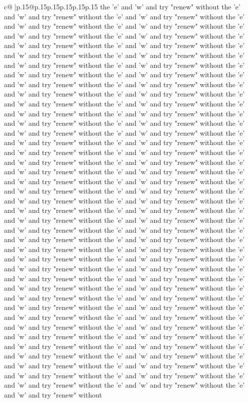 \documentclass{article}
\begin{document}
{\begin{supertabular}{c@{$\;$}|p{.15\linewidth}@{}p{.15\linewidth}p{.15\linewidth}p{.15\linewidth}p{.15\linewidth}p{.15\linewidth}}
{{{the 'e' and 'w' and try "renew" without the 'e' and 'w' and try "renew" without the 'e' and 'w' and try "renew" without the 'e' and 'w' and try "renew" without the 'e' and 'w' and try "renew" without the 'e' and 'w' and try "renew" without the 'e' and 'w' and try "renew" without the 'e' and 'w' and try "renew" without the 'e' and 'w' and try "renew" without the 'e' and 'w' and try "renew" without the 'e' and 'w' and try "renew" without the 'e' and 'w' and try "renew" without the 'e' and 'w' and try "renew" without the 'e' and 'w' and try "renew" without the 'e' and 'w' and try "renew" without the 'e' and 'w' and try "renew" without the 'e' and 'w' and try "renew" without the 'e' and 'w' and try "renew" without the 'e' and 'w' and try "renew" without the 'e' and 'w' and try "renew" without the 'e' and 'w' and try "renew" without the 'e' and 'w' and try "renew" without the 'e' and 'w' and try "renew" without the 'e' and 'w' and try "renew" without the 'e' and 'w' and try "renew" without the 'e' and 'w' and try "renew" without the 'e' and 'w' and try "renew" without the 'e' and 'w' and try "renew" without the 'e' and 'w' and try "renew" without the 'e' and 'w' and try "renew" without the 'e' and 'w' and try "renew" without the 'e' and 'w' and try "renew" without the 'e' and 'w' and try "renew" without the 'e' and 'w' and try "renew" without the 'e' and 'w' and try "renew" without the 'e' and 'w' and try "renew" without the 'e' and 'w' and try "renew" without the 'e' and 'w' and try "renew" without the 'e' and 'w' and try "renew" without the 'e' and 'w' and try "renew" without the 'e' and 'w' and try "renew" without the 'e' and 'w' and try "renew" without the 'e' and 'w' and try "renew" without the 'e' and 'w' and try "renew" without the 'e' and 'w' and try "renew" without the 'e' and 'w' and try "renew" without the 'e' and 'w' and try "renew" without the 'e' and 'w' and try "renew" without the 'e' and 'w' and try "renew" without the 'e' and 'w' and try "renew" without the 'e' and 'w' and try "renew" without the 'e' and 'w' and try "renew" without the 'e' and 'w' and try "renew" without the 'e' and 'w' and try "renew" without the 'e' and 'w' and try "renew" without the 'e' and 'w' and try "renew" without the 'e' and 'w' and try "renew" without the 'e' and 'w' and try "renew" without the 'e' and 'w' and try "renew" without the 'e' and 'w' and try "renew" without the 'e' and 'w' and try "renew" without the 'e' and 'w' and try "renew" without the 'e' and 'w' and try "renew" without the 'e' and 'w' and try "renew" without the 'e' and 'w' and try "renew" without the 'e' and 'w' and try "renew" without the 'e' and 'w' and try "renew" without the 'e' and 'w' and try "renew" without the 'e' and 'w' and try "renew" without the 'e' and 'w' and try "renew" without the 'e' and 'w' and try "renew" without the 'e' and 'w' and try "renew" without the 'e' and 'w' and try "renew" without the 'e' and 'w' and try "renew" without the 'e' and 'w' and try "renew" without the 'e' and 'w' and try "renew" without the 'e' and 'w' and try "renew" without the 'e' and 'w' and try "renew" without the 'e' and 'w' and try "renew" without the 'e' and 'w' and try "renew" without }}}
\end{supertabular}}
\end{document}
